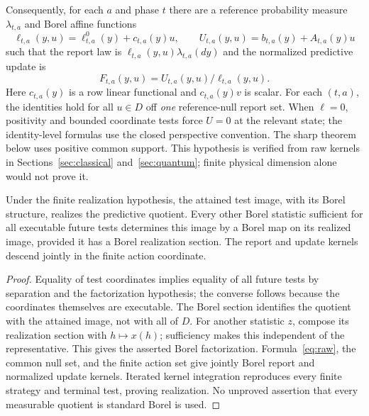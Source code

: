 Consequently, for each $a$ and phase $t$ there are a reference probability measure $\lambda_{t,a}$ and Borel affine functions
\begin{equation}\label{eq:raw}
 \ell_{t,a}(y,u)=\ell^0_{t,a}(y)+c_{t,a}(y)u,\qquad
 U_{t,a}(y,u)=b_{t,a}(y)+A_{t,a}(y)u
\end{equation}
such that the report law is $\ell_{t,a}(y,u)\lambda_{t,a}(dy)$ and the normalized predictive update is
\begin{equation}\label{eq:posterior}
 F_{t,a}(y,u)=U_{t,a}(y,u)/\ell_{t,a}(y,u).
\end{equation}
Here $c_{t,a}(y)$ is a row linear functional and $c_{t,a}(y)v$ is scalar. For each $(t,a)$, the identities hold for all $u\in D$ off \emph{one} reference-null report set. When $\ell=0$, positivity and bounded coordinate tests force $U=0$ at the relevant state; the identity-level formulas use the closed perspective convention. The sharp theorem below uses positive common support. This hypothesis is verified from raw kernels in Sections~\ref{sec:classical} and~\ref{sec:quantum}; finite physical dimension alone would not prove it.

\begin{lemma}\label{lem:quotient}
Under the finite realization hypothesis, the attained test image, with its Borel structure, realizes the predictive quotient. Every other Borel statistic sufficient for all executable future tests determines this image by a Borel map on its realized image, provided it has a Borel realization section. The report and update kernels descend jointly in the finite action coordinate.
\end{lemma}
\begin{proof}
Equality of test coordinates implies equality of all future tests by separation and the factorization hypothesis; the converse follows because the coordinates themselves are executable. The Borel section identifies the quotient with the attained image, not with all of $D$. For another statistic $z$, compose its realization section with $h\mapsto x(h)$; sufficiency makes this independent of the representative. This gives the asserted Borel factorization. Formula~\eqref{eq:raw}, the common null set, and the finite action set give jointly Borel report and normalized update kernels. Iterated kernel integration reproduces every finite strategy and terminal test, proving realization. No unproved assertion that every measurable quotient is standard Borel is used.
\end{proof}

